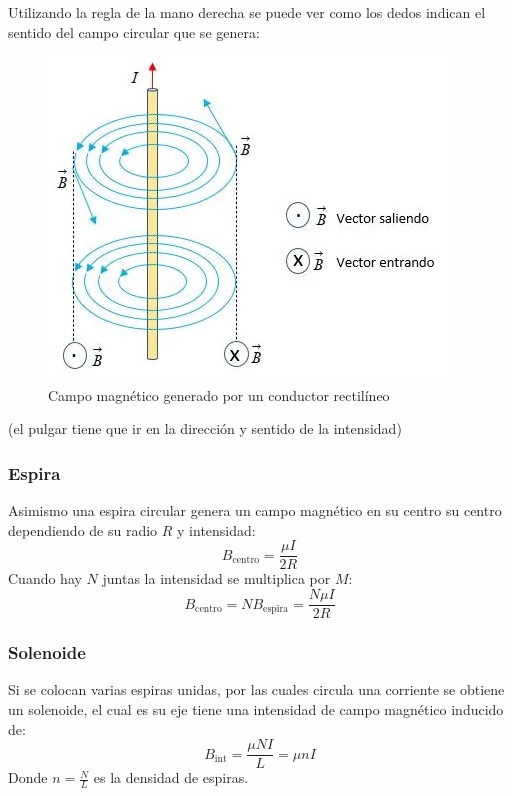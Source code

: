 \documentclass[arial,a4paper,print]{article}
\begin{document}
Utilizando la regla de la mano derecha se puede ver como los dedos indican el sentido del campo circular que se genera:
\begin{figure}[h]
	\centering
	\includegraphics[width=0.5\linewidth]{figures/magnetico_linea}
	\caption{Campo magnético generado por un conductor rectilíneo}
	\label{fig:magneticolinea}
\end{figure}
(el pulgar tiene que ir en la dirección y sentido de la intensidad)

\subsubsection{Espira}
Asimismo una espira circular genera un campo magnético en su centro su centro dependiendo de su radio $R$ y intensidad:
\begin{equation*}
	B_{\text{centro}} = \frac{\mu I}{2R}
\end{equation*}
Cuando hay $N$ juntas la intensidad se multiplica por $M$:
\begin{equation*}
	B_{\text{centro}} = NB_{\text{espira}} = \frac{N\mu I}{2R}
\end{equation*}

\subsubsection{Solenoide}
Si se colocan varias espiras unidas, por las cuales circula una corriente se obtiene un solenoide, el cual es su eje tiene una intensidad de campo magnético inducido de:
\begin{equation*}
	B_{\text{int}} = \frac{\mu NI}{L} = \mu nI
\end{equation*}
Donde $n=\frac{N}{L}$ es la densidad de espiras. 
\end{document}
